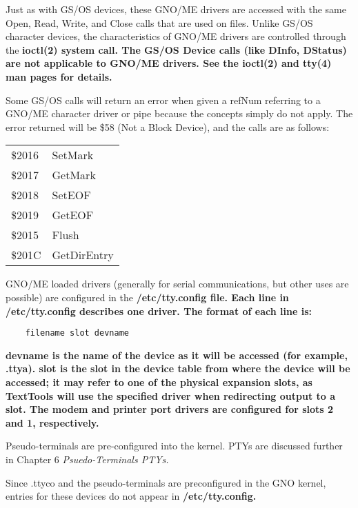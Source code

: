 \documentclass{report}
\begin{document}
Just as with GS/OS devices, these GNO/ME
drivers are accessed with the same 
Open, Read, Write, and Close
calls that are used on files. Unlike GS/OS character devices, the
characteristics of GNO/ME drivers are controlled through the 
\bf ioctl\rm(2) system call. The GS/OS Device calls (like DInfo, DStatus)
are not applicable to GNO/ME drivers. See the \bf ioctl\rm(2) and 
\bf tty\rm(4) man pages for details.

Some GS/OS calls will return an error when
given a refNum referring to a GNO/ME character driver or pipe
because the concepts simply do not apply. The error returned will
be \$58 (Not a Block Device), and the calls are as follows:

\begin{tabular}{ll}
\$2016 & SetMark \\
\$2017 & GetMark \\
\$2018 & SetEOF \\
\$2019 & GetEOF \\
\$2015 & Flush \\
\$201C & GetDirEntry \\
\end{tabular}

GNO/ME loaded drivers (generally for serial
communications, but other uses are possible) are configured in the 
 \bf /etc/tty.config \rm file.
Each line in 
\bf /etc/tty.config \rm describes one driver. The format of each line is:

\begin{verbatim}
    filename slot devname
\end{verbatim}

\bf devname \rm is the name of the device as
it will be accessed (for example, 
\bf.ttya\rm). \bf slot \rm is the slot in the
device table from where the device will be accessed; it may refer
to one of the physical expansion slots, as TextTools will use the
specified driver when redirecting output to a slot. The \bf modem \rm
and \bf printer \rm port drivers are configured for slots 2 and 1,
respectively.

Pseudo-terminals are pre-configured into
the kernel. PTYs are discussed further in Chapter 6 \it Psuedo-Terminals
PTYs\rm.

Since .ttyco and the pseudo-terminals are
preconfigured in the GNO kernel, entries for these devices do
not appear in  \bf /etc/tty.config\rm.
\end{document}
